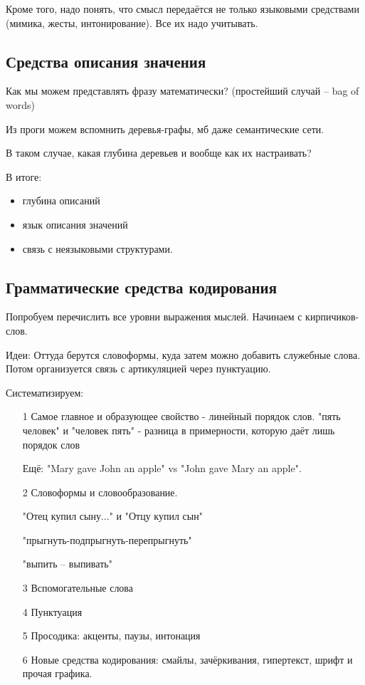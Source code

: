 \documentclass[a4paper,12pt]{article}
\theoremstyle{plain} %
\theoremstyle{definition} %
\theoremstyle{remark} %
\begin{document}
	Кроме того, надо понять, что смысл передаётся не только языковыми средствами (мимика, жесты, интонирование). Все их надо учитывать.
	
	\subsection { Средства описания значения }
	
	Как мы можем представлять фразу математически? (простейший случай -- bag of words)
	
	Из проги можем вспомнить деревья-графы, мб даже семантические сети.
	
	В таком случае, какая глубина деревьев и вообще как их настраивать?
	
	В итоге:
	
	\begin{itemize}	%
		\item глубина описаний
	
		\item язык описания значений
	
		\item связь с неязыковыми структурами.
	\end{itemize}
	
	\subsection { Грамматические средства кодирования }
	
	Попробуем перечислить все уровни выражения мыслей. Начинаем с кирпичиков-слов.
	
	Идеи: Оттуда берутся словоформы, куда затем можно добавить служебные слова. Потом организуется связь с артикуляцией через пунктуацию.
	
	Систематизируем: 
	
	\begin{itemize} %
		\item[1] Самое главное и образующее свойство - линейный порядок слов. "пять человек" и "человек пять" - разница в примерности, которую даёт лишь порядок слов
		
		Ещё: "Mary gave John an apple" vs "John gave Mary an apple".
		
		\item[2] Словоформы и словообразование.
		
		"Отец купил сыну..." и "Отцу купил сын"
		
		"прыгнуть-подпрыгнуть-перепрыгнуть"
		
		"выпить -- выпивать"
		
		\item[3] Вспомогательные слова
		
		\item[4] Пунктуация
		
		\item[5] Просодика: акценты, паузы, интонация
		
		\item[6] Новые средства кодирования: смайлы, зачёркивания, гипертекст, шрифт и прочая графика.
	\end{itemize}
	
\end{document}
